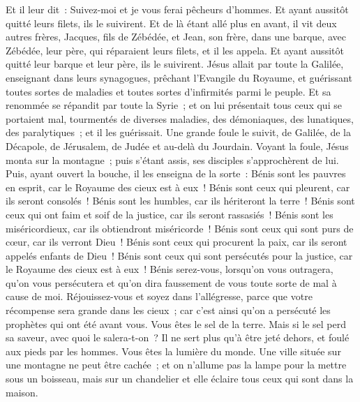 \begin{multicols}{2}
Et il leur dit~: Suivez-moi et je vous ferai pêcheurs d'hommes.
Et ayant aussitôt quitté leurs filets, ils le suivirent.
Et de là étant allé plus en avant, il vit deux autres frères, Jacques, fils de Zébédée, et Jean, son frère, dans une barque, avec Zébédée, leur père, qui réparaient leurs filets, et il les appela.
Et ayant aussitôt quitté leur barque et leur père, ils le suivirent.
Jésus allait par toute la Galilée, enseignant dans leurs synagogues, prêchant l'Evangile du Royaume, et guérissant toutes sortes de maladies et toutes sortes d'infirmités parmi le peuple.
Et sa renommée se répandit par toute la Syrie~; et on lui présentait tous ceux qui se portaient mal, tourmentés de diverses maladies, des démoniaques, des lunatiques, des paralytiques~; et il les guérissait.
Une grande foule le suivit, de Galilée, de la Décapole, de Jérusalem, de Judée et au-delà du Jourdain.
\VerseOne{}Voyant la foule, Jésus monta sur la montagne~; puis s'étant assis, ses disciples s'approchèrent de lui.
Puis, ayant ouvert la bouche, il les enseigna de la sorte~:
Bénis sont les pauvres en esprit, car le Royaume des cieux est à eux~!
Bénis sont ceux qui pleurent, car ils seront consolés~!
Bénis sont les humbles, car ils hériteront la terre~!
Bénis sont ceux qui ont faim et soif de la justice, car ils seront rassasiés~!
Bénis sont les miséricordieux, car ils obtiendront miséricorde~!
Bénis sont ceux qui sont purs de cœur, car ils verront Dieu~!
Bénis sont ceux qui procurent la paix, car ils seront appelés enfants de Dieu~!
Bénis sont ceux qui sont persécutés pour la justice, car le Royaume des cieux est à eux~!
Bénis serez-vous, lorsqu'on vous outragera, qu'on vous persécutera et qu'on dira faussement de vous toute sorte de mal à cause de moi.
Réjouissez-vous et soyez dans l'allégresse, parce que votre récompense sera grande dans les cieux~; car c'est ainsi qu'on a persécuté les prophètes qui ont été avant vous.
Vous êtes le sel de la terre. Mais si le sel perd sa saveur, avec quoi le salera-t-on~? Il ne sert plus qu'à être jeté dehors, et foulé aux pieds par les hommes.
Vous êtes la lumière du monde. Une ville située sur une montagne ne peut être cachée~;
et on n'allume pas la lampe pour la mettre sous un boisseau, mais sur un chandelier et elle éclaire tous ceux qui sont dans la maison.

\end{multicols}
